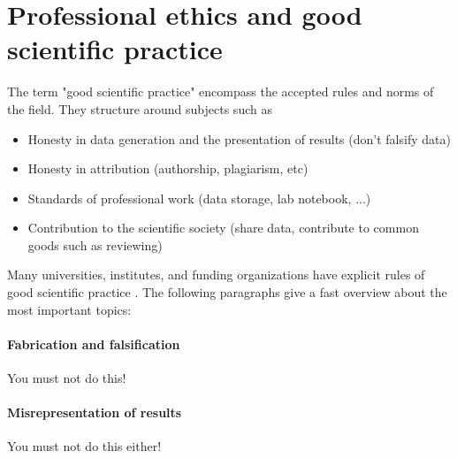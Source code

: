 \documentclass{tufte-book}
\begin{document}
\section{Professional ethics and good scientific practice}

The term "good scientific practice" encompass the accepted rules and norms of the field. They structure around subjects such as 

\begin{itemize}
\item Honesty in data generation and the presentation of results (don't falsify data)
\item Honesty in attribution (authorship, plagiarism, etc)
\item Standards of professional work (data storage, lab notebook, ...)
\item Contribution to the scientific society (share data, contribute to common goods such as reviewing)
\end{itemize}

Many
 universities, institutes, and funding organizations have explicit rules of good scientific practice \citet[e.g.][]{Forschungsgemeinschaft-RulesGoodScientific-2013}. The following paragraphs give a fast overview about the most important topics:


\paragraph{Fabrication and falsification} You must not do this!

\paragraph{Misrepresentation of results} You must not do this either!
\end{document}
